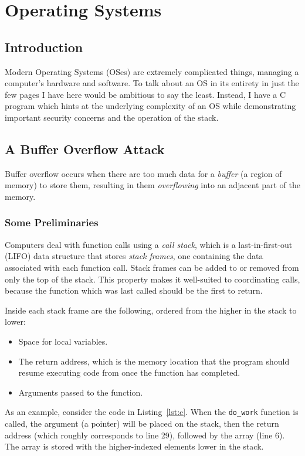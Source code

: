 \documentclass[11pt,a4paper]{report}
\begin{document}
	\chapter{Operating Systems}
	\section{Introduction}
	Modern Operating Systems (OSes) are extremely complicated things, managing a computer's hardware and software. To talk about an OS in its entirety in just the few pages I have here would be ambitious to say the least. Instead, I have a C program which hints at the underlying complexity of an OS while demonstrating important security concerns and the operation of the stack.
	
	\section{A Buffer Overflow Attack}
	Buffer overflow occurs when there are too much data for a \textit{buffer} (a region of memory) to store them, resulting in them \textit{overflowing} into an adjacent part of the memory.
	\subsection{Some Preliminaries}
	Computers deal with function calls using a \textit{call stack}, which is a last-in-first-out (LIFO) data structure that stores \textit{stack frames}, one containing the data associated with each function call. Stack frames can be added to or removed from only the top of the stack. This property makes it well-suited to coordinating calls, because the function which was last called should be the first to return.
	
	Inside each stack frame are the following, ordered from the higher in the stack to lower:
	\begin{itemize}
		\item Space for local variables.
		\item The return address, which is the memory location that the program should resume executing code from once the function has completed.
		\item Arguments passed to the function.
	\end{itemize}
	
	As an example, consider the code in Listing~\ref{lst:c}. When the \verb|do_work| function is called, the argument (a pointer) will be placed on the stack, then the return address (which roughly corresponds to line 29), followed by the array (line 6). The array is stored with the higher-indexed elements lower in the stack.
	
\end{document}
